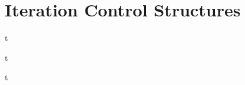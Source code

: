 \documentclass[../lecture2-variablesandcontrolstructures.tex]{subfiles}
\begin{document}
\section{Iteration Control Structures}


\begin{frame}[fragile]{}
t
\end{frame}


\begin{frame}[fragile]{}
t
\end{frame}


\begin{frame}[fragile]{}
t
\end{frame}

\end{document}
